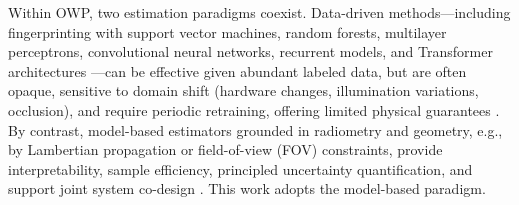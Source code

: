 \documentclass[journal]{IEEEtran}
\begin{document}
Within OWP, two estimation paradigms coexist. Data-driven methods---including fingerprinting with support vector machines, random forests, multilayer perceptrons, convolutional neural networks, recurrent models, and Transformer architectures \cite{Rekkas2023, Tran2022}---can be effective given abundant labeled data, but are often opaque, sensitive to domain shift (hardware changes, illumination variations, occlusion), and require periodic retraining, offering limited physical guarantees \cite{Glass2021}. By contrast, model-based estimators grounded in radiometry and geometry, e.g., by Lambertian propagation or field-of-view (FOV) constraints, provide interpretability, sample efficiency, principled uncertainty quantification, and support joint system co-design \cite{Deng2023}. This work adopts the model-based paradigm.
\end{document}
